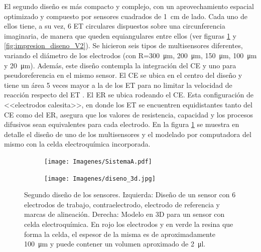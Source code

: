		 	 El segundo diseño es más compacto y complejo, con un aprovechamiento espacial optimizado y compuesto por sensores cuadrados de \SI{1}{\cm} de lado. Cada uno de ellos tiene, a su vez, 6 ET circulares dispuestos sobre una circunferencia imaginaria, de manera que queden equiangulares entre ellos (ver figuras \ref{fig:mascara_diseno_v2} y \ref{fig:impresion_diseno_V2}). Se hicieron seis tipos de multisensores diferentes, variando el diámetro de los electrodos (con R=\SI{300}{\um}, \SI{200}{\um}, \SI{150}{\um}, \SI{100}{\um} y \SI{20}{\um}). Además, este diseño contempla la integración del CE y uno para pseudoreferencia en el mismo sensor. El CE se ubica en el centro del diseño y tiene un área 5 veces mayor a la de los ET para no limitar la velocidad de reacción respecto del ET \cite{Wi2000}. El ER se ubica rodeando el CE. Esta configuración de <<electrodos calesita>>, en donde los ET se encuentren equidistantes tanto del CE como del ER, asegura que los valores de resistencia, capacidad y los procesos difusivos sean equivalentes para cada electrodo.\cite{Bockris1974}  En la figura \ref{fig:mascara_diseno_v2} se muestra en detalle el diseño de uno de los multisensores y el modelado por computadora del mismo con la celda electroquímica incorporada. 

		    	    \begin{figure}[b!]
			 	    \begin{subfigure}[t]{0.395\textwidth}
			       	\texttt{[image: Imagenes/SistemaA.pdf]}
			    	\end{subfigure}
					\begin{subfigure}[t]{0.595\textwidth}
			        \texttt{[image: Imagenes/diseno\_3d.jpg]}
			        \end{subfigure}
			     	\caption[Segundo diseño y máscara de los sensores]{Segundo diseño de los sensores. Izquierda: Diseño de un sensor con 6 electrodos de trabajo, contraelectrodo, electrodo de referencia y marcas de alineación. Derecha: Modelo en 3D para un sensor con celda electroquímica. En rojo los electrodos y en verde la resina que forma la celda, el espesor de la misma es de aproximadamente \SI{100}{\um} y puede contener un volumen aproximado de \SI{2}{\ul}.}
			     	\label{fig:mascara_diseno_v2}
			     	\end{figure}
			 
